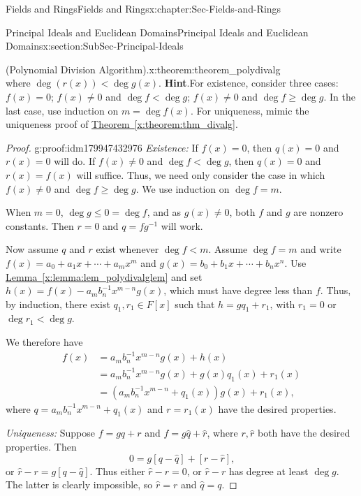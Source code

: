 \documentclass[oneside,10pt,]{book}
\newcommand{\blocktitlefont}{\relax}
\newcommand{\xreffont}{\relax}
\numberwithin{equation}{section}
\renewcommand{\le}{\leqslant}
\renewcommand{\ge}{\geqslant}
\newcommand{\lt}{<}
\newcommand{\amp}{&}
\begin{document}
\begin{chapterptx}{Fields and Rings}{}{Fields and Rings}{}{}{x:chapter:Sec-Fields-and-Rings}
\begin{sectionptx}{Principal Ideals and Euclidean Domains}{}{Principal Ideals and Euclidean Domains}{}{}{x:section:SubSec-Principal-Ideals}
\begin{theorem}{(Polynomial Division Algorithm).}{}{x:theorem:theorem_polydivalg}
\begin{equation*}
\end{equation*}
where \(\deg(r(x)) \lt  \deg g(x)\).%
\textbf{\blocktitlefont Hint}.\quad{}For existence, consider three cases: \(f(x) = 0\); \(f(x) \ne 0\) and \(\deg f \lt \deg g\); \(f(x) \ne 0\) and \(\deg f \ge \deg g\). In the last case, use induction on \(m = \deg f(x)\). For uniqueness, mimic the uniqueness proof of \hyperref[x:theorem:thm_divalg]{Theorem~{\xreffont\ref{x:theorem:thm_divalg}}}.%
\end{theorem}
\begin{proof}{}{g:proof:idm179947432976}
\emph{Existence:} If \(f(x) = 0\), then \(q(x) = 0\) and \(r(x) = 0\) will do. If \(f(x)\ne 0\) and \(\deg f \lt \deg g\), then \(q(x) = 0\) and \(r(x) = f(x)\) will suffice. Thus, we need only consider the case in which \(f(x) \ne 0\) and \(\deg f \ge \deg g\). We use induction on \(\deg f = m\).%
\par
When \(m = 0\), \(\deg g \le 0 = \deg f\), and as \(g(x) \ne 0\), both \(f\) and \(g\) are nonzero constants. Then \(r = 0\) and \(q = fg^{-1}\) will work.%
\par
Now assume \(q\) and \(r\) exist whenever \(\deg f \lt m\). Assume \(\deg f = m\) and write \(f(x) = a_0 + a_1 x + \cdots + a_m x^m\) and \(g(x) = b_0 + b_1 x + \cdots + b_n x^n\). Use \hyperref[x:lemma:lem_polydivalglem]{Lemma~{\xreffont\ref{x:lemma:lem_polydivalglem}}} and set \(h(x) = f(x) - a_m b_n^{-1} x^{m-n} g(x)\), which must have degree less than \(f\). Thus, by induction, there exist \(q_1, r_1\in F[x]\) such that \(h = g q_1 + r_1\), with \(r_1 = 0\) or \(\deg r_1 \lt \deg g\).%
\par
We therefore have%
\begin{align*}
f(x) \amp = a_m b_n^{-1} x^{m-n} g(x) + h(x)\\
\amp = a_m b_n^{-1} x^{m-n} g(x) + g(x) q_1(x) + r_1(x)\\
\amp = (a_m b_n^{-1} x^{m-n} + q_1(x)) g(x) + r_1(x)\text{,}
\end{align*}
where \(q = a_m b_n^{-1} x^{m-n} + q_1(x)\) and \(r = r_1(x)\) have the desired properties.%
\par
\emph{Uniqueness:} Suppose \(f = gq + r\) and \(f = g\hat{q} + \hat{r}\), where \(r,\hat{r}\) both have the desired properties. Then%
\begin{equation*}
0 = g[q - \hat{q}] + [r - \hat{r}]\text{,}
\end{equation*}
or \(\hat{r} - r = g [q - \hat{q}]\). Thus either \(\hat{r} - r = 0\), or \(\hat{r} - r\) has degree at least \(\deg g\). The latter is clearly impossible, so \(\hat{r} = r\) and \(\hat{q} = q\).%

\end{proof}
\end{sectionptx}
\end{chapterptx}
\end{document}
